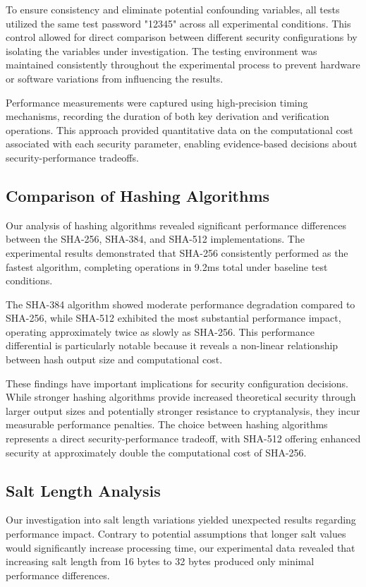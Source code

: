 \documentclass[11pt,a4paper]{article}
\begin{document}
To ensure consistency and eliminate potential confounding variables, all tests utilized the same test password "12345" across all experimental conditions. This control allowed for direct comparison between different security configurations by isolating the variables under investigation. The testing environment was maintained consistently throughout the experimental process to prevent hardware or software variations from influencing the results.

Performance measurements were captured using high-precision timing mechanisms, recording the duration of both key derivation and verification operations. This approach provided quantitative data on the computational cost associated with each security parameter, enabling evidence-based decisions about security-performance tradeoffs.

\subsection{Comparison of Hashing Algorithms}
Our analysis of hashing algorithms revealed significant performance differences between the SHA-256, SHA-384, and SHA-512 implementations. The experimental results demonstrated that SHA-256 consistently performed as the fastest algorithm, completing operations in 9.2ms total under baseline test conditions.

The SHA-384 algorithm showed moderate performance degradation compared to SHA-256, while SHA-512 exhibited the most substantial performance impact, operating approximately twice as slowly as SHA-256. This performance differential is particularly notable because it reveals a non-linear relationship between hash output size and computational cost.

These findings have important implications for security configuration decisions. While stronger hashing algorithms provide increased theoretical security through larger output sizes and potentially stronger resistance to cryptanalysis, they incur measurable performance penalties. The choice between hashing algorithms represents a direct security-performance tradeoff, with SHA-512 offering enhanced security at approximately double the computational cost of SHA-256.
\subsection{Salt Length Analysis}
Our investigation into salt length variations yielded unexpected results regarding performance impact. Contrary to potential assumptions that longer salt values would significantly increase processing time, our experimental data revealed that increasing salt length from 16 bytes to 32 bytes produced only minimal performance differences.
\end{document}
